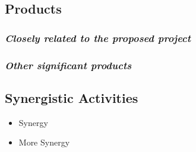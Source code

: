 \documentclass[nsfbio]{nsfproposal}
\begin{document}
\subsection{Products}
\subsubsection{\textit{Closely related to the proposed project}}

\subsubsection{\textit{Other significant products}}

\subsection{Synergistic Activities}
\begin{itemize}
	\item Synergy
	\item More Synergy
\end{itemize}
\end{document}
